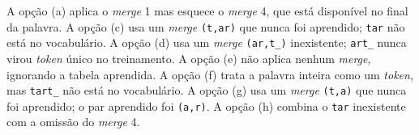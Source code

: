 \documentclass{dlproblemset}
\begin{document}
A opção (a) aplica o \textit{merge} 1 mas esquece o \textit{merge} 4, que está
disponível no final da palavra. A opção (c) usa um \textit{merge} \texttt{(t,ar)} que
nunca foi aprendido; \texttt{tar} não está no vocabulário. A opção (d) usa um
\textit{merge} \texttt{(ar,t\_)} inexistente; \texttt{art\_} nunca virou \textit{token}
único no treinamento. A opção (e) não aplica nenhum \textit{merge}, ignorando a tabela
aprendida. A opção (f) trata a palavra inteira como um \textit{token}, mas
\texttt{tart\_} não está no vocabulário. A opção (g) usa um \textit{merge}
\texttt{(t,a)} que nunca foi aprendido; o par aprendido foi \texttt{(a,r)}. A opção (h)
combina o \texttt{tar} inexistente com a omissão do \textit{merge} 4.
\end{document}

